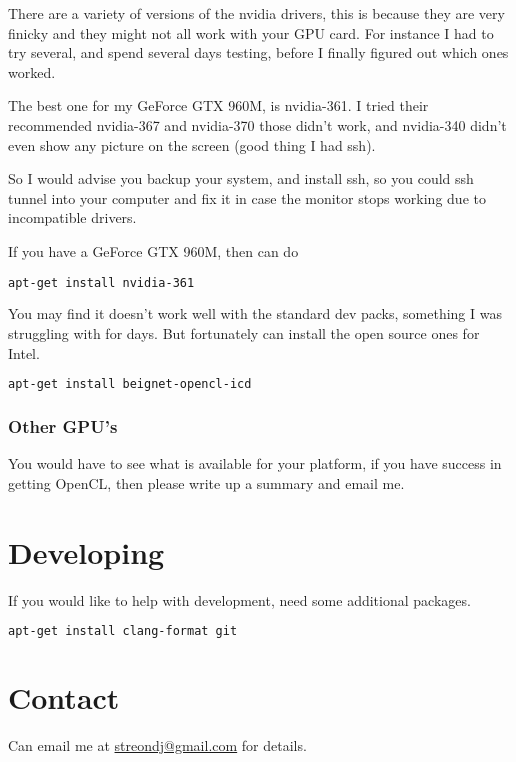 \documentclass[12pt]{article}
\begin{document}
There are a variety of versions of the nvidia drivers, this is because they are
very finicky and they might not all work with your GPU card.  For instance I had
to try several, and spend several days testing, before I finally figured out
which ones worked. 

The best one for my GeForce GTX 960M, is nvidia-361. I tried their recommended
nvidia-367 and nvidia-370 those didn't work, and nvidia-340 didn't even show any
picture on the screen (good thing I had ssh). 

So I would advise you backup your system, and install ssh, so you could ssh
tunnel into your computer and fix it in case the monitor stops working due to
incompatible drivers. 

If you have a GeForce GTX 960M, then can do
\begin{lstlisting}[language=bash]
apt-get install nvidia-361 
\end{lstlisting}

You may find it doesn't work well with the standard dev packs, something I was
struggling with for days.  But fortunately can install the open source ones 
for Intel.

\begin{lstlisting}[language=bash]
apt-get install beignet-opencl-icd
\end{lstlisting}


\subsubsection{Other GPU's}
You would have to see what is available for your platform,
if you have success in getting OpenCL, then please write up a summary and email
me.

\section{Developing}

If you would like to help with development, need some additional packages.
\begin{lstlisting}[language=bash]
apt-get install clang-format git
\end{lstlisting}

\section{Contact}
Can email me at \href{mailto:streondj@gmail.com}{streondj@gmail.com}
for details.
\end{document}
